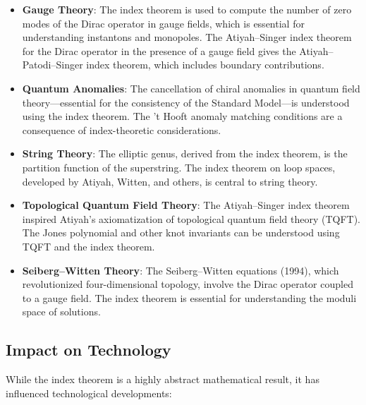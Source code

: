 \begin{itemize}
\item \textbf{Gauge Theory}: The index theorem is used to compute the number of zero modes of the Dirac operator in gauge fields, which is essential for understanding instantons and monopoles. The Atiyah--Singer index theorem for the Dirac operator in the presence of a gauge field gives the Atiyah--Patodi--Singer index theorem, which includes boundary contributions.

\item \textbf{Quantum Anomalies}: The cancellation of chiral anomalies in quantum field theory---essential for the consistency of the Standard Model---is understood using the index theorem. The 't Hooft anomaly matching conditions are a consequence of index-theoretic considerations.

\item \textbf{String Theory}: The elliptic genus, derived from the index theorem, is the partition function of the superstring. The index theorem on loop spaces, developed by Atiyah, Witten, and others, is central to string theory.

\item \textbf{Topological Quantum Field Theory}: The Atiyah--Singer index theorem inspired Atiyah's axiomatization of topological quantum field theory (TQFT). The Jones polynomial and other knot invariants can be understood using TQFT and the index theorem.

\item \textbf{Seiberg--Witten Theory}: The Seiberg--Witten equations (1994), which revolutionized four-dimensional topology, involve the Dirac operator coupled to a gauge field. The index theorem is essential for understanding the moduli space of solutions.
\end{itemize}

\subsection{Impact on Technology}

While the index theorem is a highly abstract mathematical result, it has influenced technological developments:

